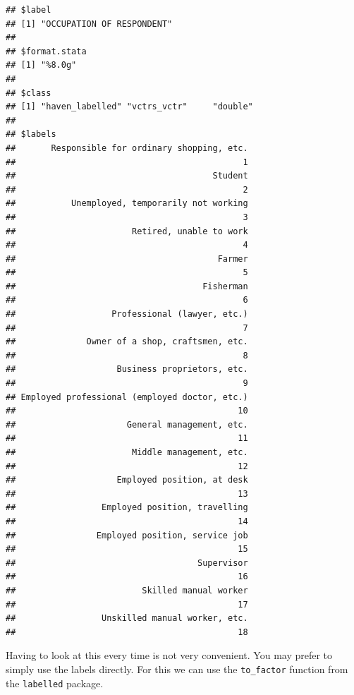 \documentclass[
]{book}
\newenvironment{Shaded}{\begin{snugshade}}{\end{snugshade}}
\newcommand{\FunctionTok}[1]{\textcolor[rgb]{0.00,0.00,0.00}{#1}}
\newcommand{\NormalTok}[1]{#1}
\newcommand{\OtherTok}[1]{\textcolor[rgb]{0.56,0.35,0.01}{#1}}
\newcommand{\SpecialCharTok}[1]{\textcolor[rgb]{0.00,0.00,0.00}{#1}}
\begin{document}
\begin{verbatim}
## $label
## [1] "OCCUPATION OF RESPONDENT"
## 
## $format.stata
## [1] "%8.0g"
## 
## $class
## [1] "haven_labelled" "vctrs_vctr"     "double"        
## 
## $labels
##       Responsible for ordinary shopping, etc. 
##                                             1 
##                                       Student 
##                                             2 
##           Unemployed, temporarily not working 
##                                             3 
##                       Retired, unable to work 
##                                             4 
##                                        Farmer 
##                                             5 
##                                     Fisherman 
##                                             6 
##                   Professional (lawyer, etc.) 
##                                             7 
##              Owner of a shop, craftsmen, etc. 
##                                             8 
##                    Business proprietors, etc. 
##                                             9 
## Employed professional (employed doctor, etc.) 
##                                            10 
##                      General management, etc. 
##                                            11 
##                       Middle management, etc. 
##                                            12 
##                    Employed position, at desk 
##                                            13 
##                 Employed position, travelling 
##                                            14 
##                Employed position, service job 
##                                            15 
##                                    Supervisor 
##                                            16 
##                         Skilled manual worker 
##                                            17 
##                 Unskilled manual worker, etc. 
##                                            18
\end{verbatim}

Having to look at this every time is not very convenient. You may prefer to simply use the labels directly. For this we can use the \texttt{to\_factor} function from the \texttt{labelled} package.

\begin{Shaded}
\end{Shaded}
\end{document}
